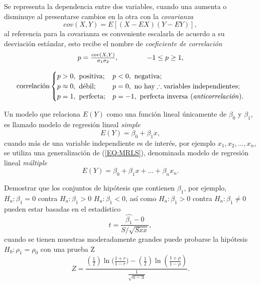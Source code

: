 Se representa la dependencia entre dos variables, cuando una aumenta o disminuye al presentarse cambios en la otra con la \emph{covarianza}
\begin{equation}
cov(X,Y)=E[(X-EX)(Y-EY)],
\end{equation}
al referencia para la covarianza es conveniente escalarla de acuerdo a su desviación estándar, esto recibe el nombre de  \emph{coeficiente de correlación}
\begin{equation}
\begin{matrix}
p=\frac{cov(X,Y)}{\sigma_1\sigma_2},\qquad\qquad-1\leq p\geq 1,\\\\
\text{correlación}\begin{cases}
p>0,\ \text{positiva};&p<0,\ \text{negativa};\\
p\approx0,\ \text{débil};&p=0,\ \text{no hay}\therefore\text{variables independientes};\\
p=1,\ \text{perfecta};&p=-1,\ \text{perfecta inversa (\emph{anticorrelación}).}\end{cases}\end{matrix}
\end{equation}

Un modelo que relaciona $E(Y)$ como una función lineal únicamente de $\beta_0$ y $\beta_1$, es llamado modelo de regresión lineal \emph{simple}
\begin{equation}
E(Y)=\beta_0+\beta_1x\label{EQ:MRLS},
\end{equation}
cuando más de una variable independiente es de interés, por ejemplo $x_1,x_2,\ldots,x_n$, se utiliza una generalización de (\ref{EQ:MRLS}), denominada modelo de regresión lineal \emph{múltiple}
\begin{equation}
E(Y)=\beta_0+\beta_1x+\ldots+\beta_nx_n.
\end{equation}

Demostrar que los conjuntos de hipótesis que contienen $\beta_1$, por ejemplo, $H_a\colon \beta_1 = 0$ contra $H_a\colon \beta_1 > 0$ $H_a\colon \beta_1 < 0$, así como $H_a\colon \beta_1 > 0$ contra $H_a\colon \beta_1 \neq 0$ pueden estar basadas en el estadístico
\begin{equation}
t=\frac{\hat{\beta_1}-0}{S/\sqrt{S{xx}}},
\end{equation}
cuando se tienen muestras moderadamente grandes puede probarse la hipótesis $H_0\colon \rho_1=\rho_0$ con una prueba Z
\begin{equation}
Z=\frac{(\frac{1}{2})\ln({\frac{1+r}{1-r})}-(\frac{1}{2})\ln(\frac{1+\rho}{1-\rho})}{\frac{1}{\sqrt{n-3}}}.
\end{equation}


